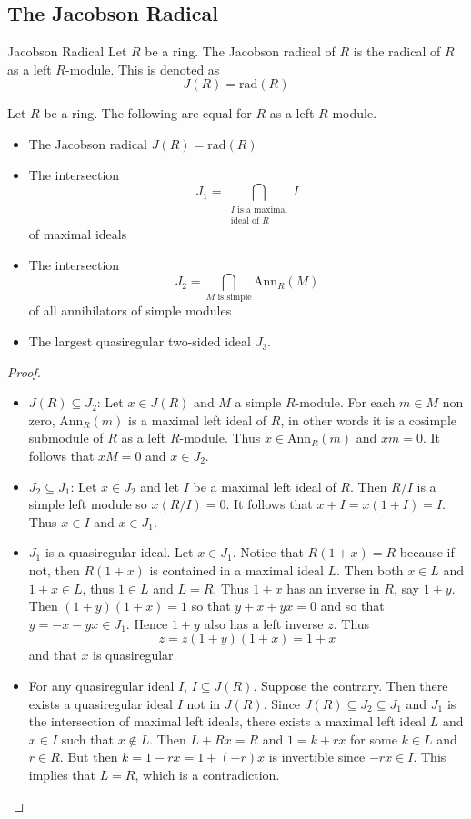 \documentclass[a4paper]{article}
\begin{document}
\subsection{The Jacobson Radical}
\begin{defn}{Jacobson Radical}{} Let $R$ be a ring. The Jacobson radical of $R$ is the radical of $R$ as a left $R$-module. This is denoted as $$J(R)=\text{rad}(R)$$
\end{defn}

\begin{thm}{}{} Let $R$ be a ring. The following are equal for $R$ as a left $R$-module. 
\begin{itemize}
\item The Jacobson radical $J(R)=\text{rad}(R)$
\item The intersection $$J_1=\bigcap_{\substack{I\text{ is a maximal}\\\text{ideal of }R}}I$$ of maximal ideals
\item The intersection $$J_2=\bigcap_{M\text{ is simple}}\text{Ann}_R(M)$$ of all annihilators of simple modules
\item The largest quasiregular two-sided ideal $J_3$. 
\end{itemize} 
\begin{proof}~\\
\begin{itemize}
\item $J(R)\subseteq J_2$: Let $x\in J(R)$ and $M$ a simple $R$-module. For each $m\in M$ non zero, $\text{Ann}_R(m)$ is a maximal left ideal of $R$, in other words it is a cosimple submodule of $R$ as a left $R$-module. Thus $x\in\text{Ann}_R(m)$ and $xm=0$. It follows that $xM=0$ and $x\in J_2$. 

\item $J_2\subseteq J_1$: Let $x\in J_2$ and let $I$ be a maximal left ideal of $R$. Then $R/I$ is a simple left module so $x(R/I)=0$. It follows that $x+I=x(1+I)=I$. Thus $x\in I$ and $x\in J_1$. 

\item $J_1$ is a quasiregular ideal. Let $x\in J_1$. Notice that $R(1+x)=R$ because if not, then $R(1+x)$ is contained in a maximal ideal $L$. Then both $x\in L$ and $1+x\in L$, thus $1\in L$ and $L=R$. Thus $1+x$ has an inverse in $R$, say $1+y$. Then $(1+y)(1+x)=1$ so that $y+x+yx=0$ and so that $y=-x-yx\in J_1$. Hence $1+y$ also has a left inverse $z$. Thus $$z=z(1+y)(1+x)=1+x$$ and that $x$ is quasiregular. 

\item For any quasiregular ideal $I$, $I\subseteq J(R)$. Suppose the contrary. Then there exists a quasiregular ideal $I$ not in $J(R)$. Since $J(R)\subseteq J_2\subseteq J_1$ and $J_1$ is the intersection of maximal left ideals, there exists a maximal left ideal $L$ and $x\in I$ such that $x\notin L$. Then $L+Rx=R$ and $1=k+rx$ for some $k\in L$ and $r\in R$. But then $k=1-rx=1+(-r)x$ is invertible since $-rx\in I$. This implies that $L=R$, which is a contradiction. 


\end{itemize}
\end{proof}
\end{thm}
\end{document}
